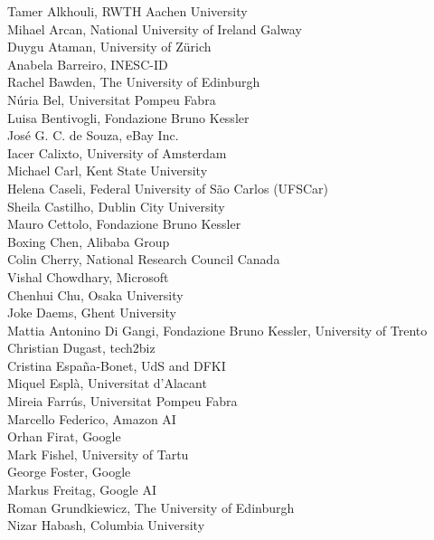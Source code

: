 \documentclass[a4paper,11pt,twoside]{book}
\begin{document}
\noindent Tamer Alkhouli, RWTH Aachen University\\
\noindent Mihael Arcan, National University of Ireland Galway\\
\noindent Duygu Ataman, University of Zürich\\
\noindent Anabela Barreiro, INESC-ID\\
\noindent Rachel Bawden, The University of Edinburgh\\
\noindent Núria Bel, Universitat Pompeu Fabra\\
\noindent Luisa Bentivogli, Fondazione Bruno Kessler\\
\noindent José G. C. de Souza, eBay Inc.\\
\noindent Iacer Calixto, University of Amsterdam\\
\noindent Michael Carl, Kent State University\\
\noindent Helena Caseli, Federal University of São Carlos (UFSCar)\\
\noindent Sheila Castilho, Dublin City University\\
\noindent Mauro Cettolo, Fondazione Bruno Kessler\\
\noindent Boxing Chen, Alibaba Group\\
\noindent Colin Cherry, National Research Council Canada\\
\noindent Vishal Chowdhary, Microsoft\\
\noindent Chenhui Chu, Osaka University\\
\noindent Joke Daems, Ghent University\\
\noindent Mattia Antonino Di Gangi, Fondazione Bruno Kessler, University of Trento\\
\noindent Christian Dugast, tech2biz\\
\noindent Cristina España-Bonet, UdS and DFKI\\
\noindent Miquel Esplà, Universitat d'Alacant\\
\noindent Mireia Farrús, Universitat Pompeu Fabra\\
\noindent Marcello Federico, Amazon AI\\
\noindent Orhan Firat, Google\\
\noindent Mark Fishel, University of Tartu\\
\noindent George Foster, Google\\
\noindent Markus Freitag, Google AI\\
\noindent Roman Grundkiewicz, The University of Edinburgh\\
\noindent Nizar Habash, Columbia University\\
\end{document}
